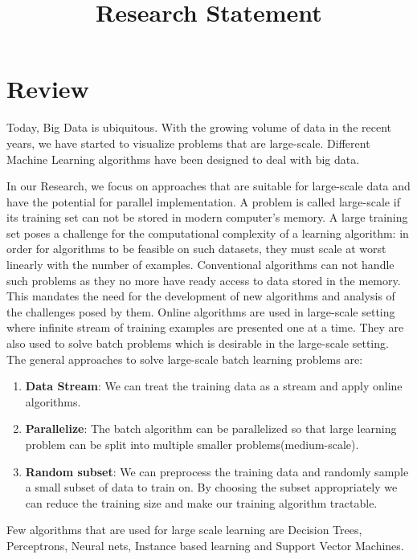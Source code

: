 \documentclass{article}
\title{Research Statement}
\date{}
\begin{document}
\maketitle

\section{Review}
Today, Big Data is ubiquitous. With the growing volume of data in the recent years, we have started to visualize problems that are large-scale. Different Machine Learning algorithms have been designed to deal with big data.

In our Research, we focus on approaches that are suitable for large-scale data and have the potential for parallel implementation. A problem is called large-scale if its training set can not be stored in modern computer's memory. A large training set poses a challenge for the computational complexity of a learning algorithm: in order for algorithms to be feasible on such datasets, they must scale at
worst linearly with the number of examples. Conventional algorithms can not handle such problems as they no more have ready access to data stored in the memory. This mandates the need for the development of new algorithms and analysis of the challenges posed by them.
Online algorithms are used in large-scale setting where infinite stream of training examples are presented one at a time. They are also used to solve batch problems which is desirable in the large-scale setting. The general approaches to solve large-scale batch learning problems are:
\begin{enumerate}
\item \textbf{Data Stream}: We can treat the training data as a stream and apply online algorithms.
\item \textbf{Parallelize}: The batch algorithm can be parallelized so that large learning problem can be split into multiple smaller problems(medium-scale).
\item \textbf{Random subset}: We can preprocess the training data and randomly sample a small subset of data to train on. By choosing the subset appropriately we can reduce the training size and make our training algorithm tractable.
\end{enumerate}
Few algorithms that are used for large scale learning are Decision Trees, Perceptrons, Neural nets, Instance based learning and Support Vector Machines.
\end{document}
